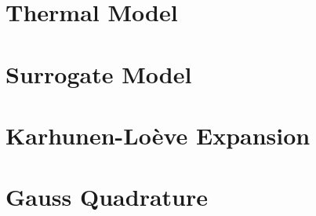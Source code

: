 \renewcommand{\thesection}{S\arabic{section}}
\renewcommand{\thetable}{S\arabic{table}}
\renewcommand{\thefigure}{S\arabic{figure}}
\setcounter{table}{0}
\setcounter{figure}{0}



\section{Thermal Model} 


\section{Surrogate Model} 


\section{Karhunen-Lo\`{e}ve Expansion} 


\section{Gauss Quadrature} 

